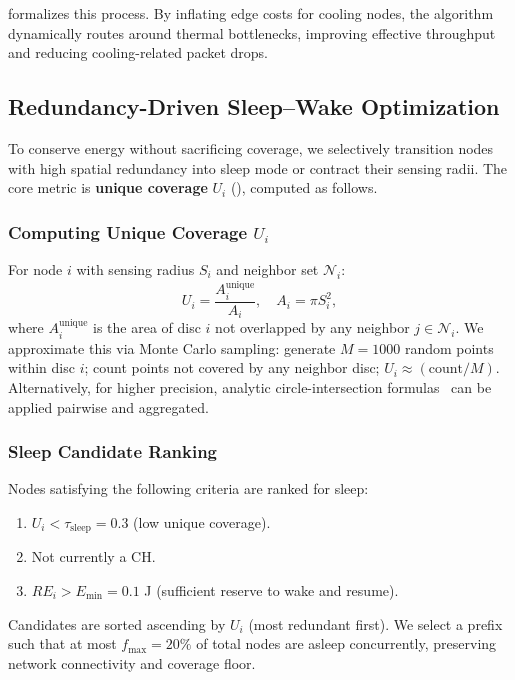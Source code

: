  formalizes this process. By inflating edge costs for cooling nodes, the algorithm dynamically routes around thermal bottlenecks, improving effective throughput and reducing cooling-related packet drops.

\subsection{Redundancy-Driven Sleep--Wake Optimization}
\label{subsec:sleep-wake}

To conserve energy without sacrificing coverage, we selectively transition nodes with high spatial redundancy into sleep mode or contract their sensing radii. The core metric is \textbf{unique coverage} $U_i$ (), computed as follows.

\subsubsection{Computing Unique Coverage $U_i$}
For node $i$ with sensing radius $S_i$ and neighbor set $\mathcal{N}_i$:
\begin{equation}
U_i = \frac{A_i^{\text{unique}}}{A_i}, \quad A_i = \pi S_i^2,
\end{equation}
where $A_i^{\text{unique}}$ is the area of disc $i$ not overlapped by any neighbor $j \in \mathcal{N}_i$. We approximate this via Monte Carlo sampling: generate $M=1000$ random points within disc $i$; count points not covered by any neighbor disc; $U_i \approx (\text{count}/M)$. Alternatively, for higher precision, analytic circle-intersection formulas~\cite{weisstein_circle} can be applied pairwise and aggregated.

\subsubsection{Sleep Candidate Ranking}
Nodes satisfying the following criteria are ranked for sleep:
\begin{enumerate}[label=(\roman*),noitemsep]
  \item $U_i < \tau_{\text{sleep}} = 0.3$ (low unique coverage).
  \item Not currently a CH.
  \item $RE_i > E_{\text{min}} = 0.1$ J (sufficient reserve to wake and resume).
\end{enumerate}
Candidates are sorted ascending by $U_i$ (most redundant first). We select a prefix such that at most $f_{\max}=20\%$ of total nodes are asleep concurrently, preserving network connectivity and coverage floor.

